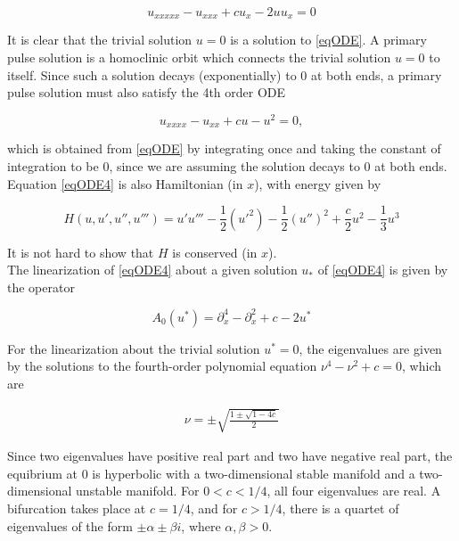 \documentclass[12pt]{article}
\begin{document}
\begin{equation}\label{eqODE}
u_{xxxxx} - u_{xxx} + c u_x - 2 u u_x = 0
\end{equation}

It is clear that the trivial solution $u = 0$ is a solution to \eqref{eqODE}. A primary pulse solution is a homoclinic orbit which connects the trivial solution $u = 0$ to itself. Since such a solution decays (exponentially) to 0 at both ends, a primary pulse solution must also satisfy the 4th order ODE

\begin{equation}\label{eqODE4}
u_{xxxx} - u_{xx} + c u - u^2 = 0,
\end{equation}

which is obtained from \eqref{eqODE} by integrating once and taking the constant of integration to be 0, since we are assuming the solution decays to 0 at both ends. Equation \eqref{eqODE4} is also Hamiltonian (in $x$), with energy given by

\begin{equation}\label{Hamiltonian}
H(u, u', u'', u''') = u'u''' - \frac{1}{2}(u'^2) - \frac{1}{2}(u'')^2 + \frac{c}{2}u^2 - \frac{1}{3}u^3 
\end{equation}

It is not hard to show that $H$ is conserved (in $x$).\\

The linearization of \eqref{eqODE4} about a given solution $u_*$ of \eqref{eqODE4} is given by the operator

\begin{equation}\label{defA0}
A_0(u^*) = \partial_x^4 - \partial_x^2 + c - 2 u^* 
\end{equation}

For the linearization about the trivial solution $u^* = 0$, the eigenvalues are given by the solutions to the fourth-order polynomial equation $\nu^4 - \nu^2 + c = 0$, which are

\begin{align}\label{specA0}
\nu = \pm \sqrt{ \frac{1 \pm \sqrt{1 - 4c} }{2}}
\end{align}

Since two eigenvalues have positive real part and two have negative real part, the equibrium at 0 is hyperbolic with a two-dimensional stable manifold and a two-dimensional unstable manifold. For $0 < c < 1/4$, all four eigenvalues are real. A bifurcation takes place at $c = 1/4$, and for $c > 1/4$, there is a quartet of eigenvalues of the form $\pm \alpha \pm \beta i$, where $\alpha, \beta > 0$.\\
\end{document}
